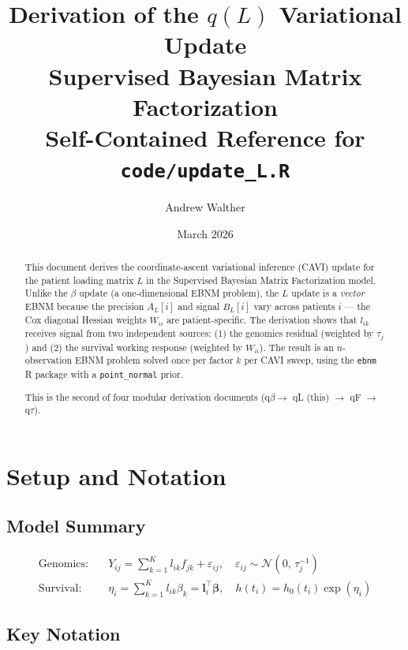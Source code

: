 \documentclass[11pt]{article}
\title{\textbf{Derivation of the $q(L)$ Variational Update}\\[4pt]
       \large Supervised Bayesian Matrix Factorization\\[4pt]
       \normalsize Self-Contained Reference for \texttt{code/update\_L.R}}
\author{Andrew Walther}
\date{March 2026}
\begin{document}
\maketitle

\begin{abstract}
This document derives the coordinate-ascent variational inference (CAVI)
update for the patient loading matrix $L$ in the Supervised Bayesian Matrix
Factorization model.  Unlike the $\beta$ update (a one-dimensional EBNM
problem), the $L$ update is a \emph{vector} EBNM because the precision
$A_L[i]$ and signal $B_L[i]$ vary across patients $i$ — the Cox diagonal
Hessian weights $W_{ii}$ are patient-specific.  The derivation shows that
$l_{ik}$ receives signal from two independent sources: (1) the genomics
residual (weighted by $\tau_j$) and (2) the survival working response
(weighted by $W_{ii}$).  The result is an $n$-observation EBNM problem solved
once per factor $k$ per CAVI sweep, using the \texttt{ebnm} R package with a
\texttt{point\_normal} prior.

This is the second of four modular derivation documents
(q$\beta \to$ qL (this) $\to$ qF $\to$ q$\tau$).
\end{abstract}

\tableofcontents
\newpage

\section{Setup and Notation}\label{sec:setup}

\subsection{Model Summary}

\begin{align}
  \text{Genomics:}\quad &
  Y_{ij} = \sum_{k=1}^K l_{ik} f_{jk} + \varepsilon_{ij},
  \quad \varepsilon_{ij} \sim \mathcal{N}(0,\,\tau_j^{-1})
  \label{eq:genomics} \\[4pt]
  \text{Survival:}\quad &
  \eta_i = \sum_{k=1}^K l_{ik}\beta_k = \bm{l}_i^\top\bm{\beta},
  \quad h(t_i) = h_0(t_i)\exp(\eta_i)
  \label{eq:survival}
\end{align}

\subsection{Key Notation}
\end{document}
